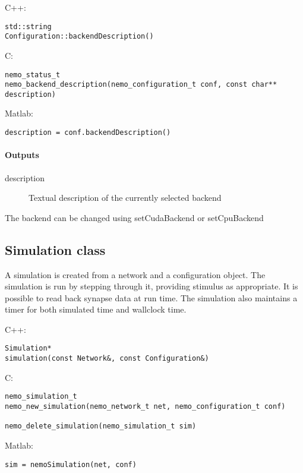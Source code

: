 \noindent C++:
\begin{lstlisting}[aboveskip=2pt]
std::string
Configuration::backendDescription()
\end{lstlisting}

\noindent C:
\begin{lstlisting}[aboveskip=2pt]
nemo_status_t
nemo_backend_description(nemo_configuration_t conf, const char** description)
\end{lstlisting}

\noindent Matlab:
\begin{lstlisting}[aboveskip=2pt]
description = conf.backendDescription()
\end{lstlisting}
\paragraph{Outputs}
\begin{description}
\item[description] Textual description of the currently selected backend
\end{description}
The backend can be changed using setCudaBackend or setCpuBackend

\clearpage
\subsection{Simulation class}
\label{Simulation}
A simulation is created from a network and a configuration object. The simulation is run by stepping through it, providing stimulus as appropriate. It is possible to read back synapse data at run time. The simulation also maintains a timer for both simulated time and wallclock time.

\noindent C++:
\begin{lstlisting}[aboveskip=2pt]
Simulation*
simulation(const Network&, const Configuration&)
\end{lstlisting}

\noindent C:
\begin{lstlisting}[aboveskip=2pt]
nemo_simulation_t
nemo_new_simulation(nemo_network_t net, nemo_configuration_t conf)
 
nemo_delete_simulation(nemo_simulation_t sim)
\end{lstlisting}

\noindent Matlab:
\begin{lstlisting}[aboveskip=2pt]
sim = nemoSimulation(net, conf)
\end{lstlisting}

